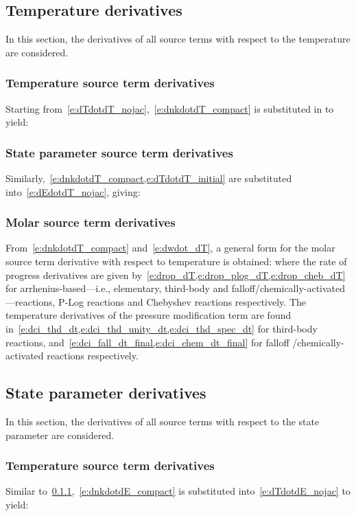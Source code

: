 \documentclass[12pt,number,sort&compress]{elsarticle}
\begin{document}
\subsection{Temperature derivatives}
In this section, the derivatives of all source terms with respect to the temperature are considered.

\subsubsection{Temperature source term derivatives}
\label{s:dtdotdt_final}
Starting from~\cref{e:dTdotdT_nojac},~\cref{e:dnkdotdT_compact} is substituted in to yield:

\subsubsection{State parameter source term derivatives}
Similarly,~\cref{e:dnkdotdT_compact,e:dTdotdT_initial} are substituted into~\cref{e:dEdotdT_nojac}, giving:

\subsubsection{Molar source term derivatives}
\label{s:dtdotdnj}
From~\cref{e:dnkdotdT_compact} and~\cref{e:dwdot_dT}, a general form for the molar source term derivative with respect to temperature is obtained:
where the rate of progress derivatives are given by~\cref{e:drop_dT,e:drop_plog_dT,e:drop_cheb_dT} for arrhenius-based---i.e., elementary, third-body and falloff\slash chemically-activated---reactions, P-Log reactions and Chebyshev reactions respectively.
The temperature derivatives of the pressure modification term are found in~\cref{e:dci_thd_dt,e:dci_thd_unity_dt,e:dci_thd_spec_dt} for third-body reactions, and~\cref{e:dci_fall_dt_final,e:dci_chem_dt_final} for falloff \slash chemically-activated reactions respectively.

\subsection{State parameter derivatives}
In this section, the derivatives of all source terms with respect to the state parameter are considered.

\subsubsection{Temperature source term derivatives}
Similar to~\cref{s:dtdotdt_final},~\cref{e:dnkdotdE_compact} is substituted into~\cref{e:dTdotdE_nojac} to yield:
\end{document}
